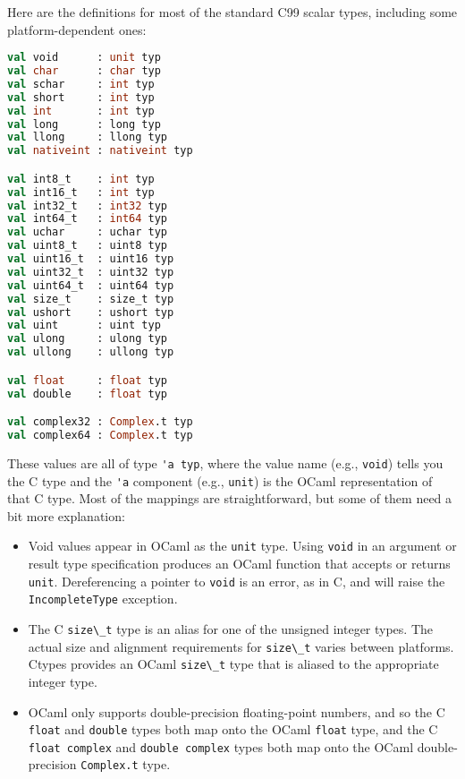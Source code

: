 Here are the definitions for most of the standard C99 scalar types,
including some platform-dependent ones: 

\begin{lstlisting}[language=Caml]
val void      : unit typ
val char      : char typ
val schar     : int typ
val short     : int typ
val int       : int typ
val long      : long typ
val llong     : llong typ
val nativeint : nativeint typ

val int8_t    : int typ
val int16_t   : int typ
val int32_t   : int32 typ
val int64_t   : int64 typ
val uchar     : uchar typ
val uint8_t   : uint8 typ
val uint16_t  : uint16 typ
val uint32_t  : uint32 typ
val uint64_t  : uint64 typ
val size_t    : size_t typ
val ushort    : ushort typ
val uint      : uint typ
val ulong     : ulong typ
val ullong    : ullong typ

val float     : float typ
val double    : float typ

val complex32 : Complex.t typ
val complex64 : Complex.t typ
\end{lstlisting}

These values are all of type \passthrough{\lstinline!'a typ!}, where the
value name (e.g., \passthrough{\lstinline!void!}) tells you the C type
and the \passthrough{\lstinline!'a!} component (e.g.,
\passthrough{\lstinline!unit!}) is the OCaml representation of that C
type. Most of the mappings are straightforward, but some of them need a
bit more explanation:

\begin{itemize}
\item
  Void values appear in OCaml as the \passthrough{\lstinline!unit!}
  type. Using \passthrough{\lstinline!void!} in an argument or result
  type specification produces an OCaml function that accepts or returns
  \passthrough{\lstinline!unit!}. Dereferencing a pointer to
  \passthrough{\lstinline!void!} is an error, as in C, and will raise
  the \passthrough{\lstinline!IncompleteType!} exception.
\item
  The C \passthrough{\lstinline!size\_t!} type is an alias for one of
  the unsigned integer types. The actual size and alignment requirements
  for \passthrough{\lstinline!size\_t!} varies between platforms. Ctypes
  provides an OCaml \passthrough{\lstinline!size\_t!} type that is
  aliased to the appropriate integer type.
\item
  OCaml only supports double-precision floating-point numbers, and so
  the C \passthrough{\lstinline!float!} and
  \passthrough{\lstinline!double!} types both map onto the OCaml
  \passthrough{\lstinline!float!} type, and the C
  \passthrough{\lstinline!float complex!} and
  \passthrough{\lstinline!double complex!} types both map onto the OCaml
  double-precision \passthrough{\lstinline!Complex.t!} type.
\end{itemize}

